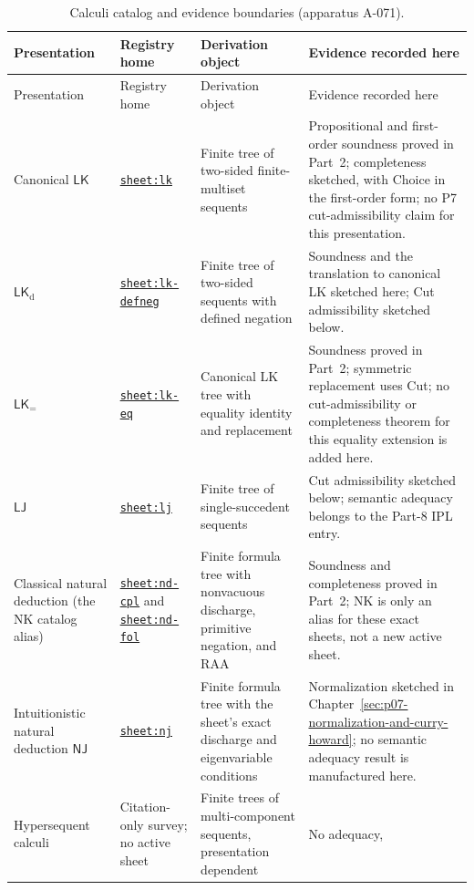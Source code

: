 \begingroup\scriptsize
\begin{longtable}{@{}p{}p{}p{}
  p{}@{}}
\caption{Calculi catalog and evidence boundaries (apparatus A-071).}
\label{tab:p07-calculi-catalog}\\
\toprule
Presentation & Registry home & Derivation object & Evidence recorded here \\
\midrule
\endfirsthead
\toprule
Presentation & Registry home & Derivation object & Evidence recorded here \\
\midrule
\endhead
Canonical \(\mathsf{LK}\) & \hyperref[sheet:lk]{\texttt{sheet:lk}} & Finite
tree of two-sided finite-multiset sequents & Propositional and first-order
soundness proved in Part~2; completeness sketched, with Choice in the
first-order form; no P7 cut-admissibility claim for this presentation. \\
\(\mathsf{LK}_{\mathrm d}\) &
\hyperref[sheet:lk-defneg]{\texttt{sheet:lk-defneg}} & Finite tree of
two-sided sequents with defined negation & Soundness and the translation to
canonical LK sketched here; Cut admissibility sketched below. \\
\(\mathsf{LK}_{=}\) & \hyperref[sheet:lk-eq]{\texttt{sheet:lk-eq}} &
Canonical LK tree with equality identity and replacement & Soundness proved
in Part~2; symmetric replacement uses Cut; no cut-admissibility or
completeness theorem for this equality extension is added here. \\
\(\mathsf{LJ}\) & \hyperref[sheet:lj]{\texttt{sheet:lj}} & Finite tree of
single-succedent sequents & Cut admissibility sketched below; semantic
adequacy belongs to the Part-8 IPL entry. \\
Classical natural deduction (the NK catalog alias) &
\hyperref[sheet:nd-cpl]{\texttt{sheet:nd-cpl}} and
\hyperref[sheet:nd-fol]{\texttt{sheet:nd-fol}} & Finite formula tree with
nonvacuous discharge, primitive negation, and RAA & Soundness and
completeness proved in Part~2; NK is only an alias for these exact sheets,
not a new active sheet. \\
Intuitionistic natural deduction \(\mathsf{NJ}\) &
\hyperref[sheet:nj]{\texttt{sheet:nj}} & Finite formula tree with the
sheet's exact discharge and eigenvariable conditions & Normalization sketched
in Chapter~\ref{sec:p07-normalization-and-curry-howard}; no semantic adequacy
result is manufactured here. \\
Hypersequent calculi & Citation-only survey; no active sheet & Finite trees of
multi-component sequents, presentation dependent & No adequacy,

\end{longtable}
